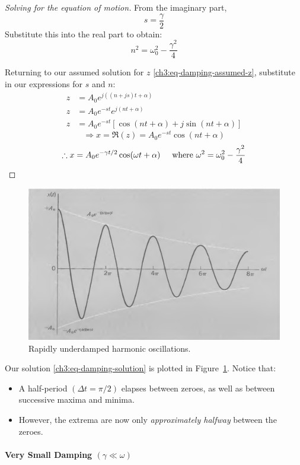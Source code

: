 \begin{proof}[Solving for the equation of motion]
	From the imaginary part,
	\[ s=\frac{\gamma}{2}\]
	Substitute this into the real part to obtain:
	\[ n^2 = \omega_0^2 - \frac{\gamma^2}{4} \]
	
	Returning to our assumed solution for $z$ \eqref{ch3:eq-damping-assumed-z}, substitute in our expressions for $s$ and $n$:
	\begin{align*}
		z&=A_0 e^{j((n+js)t+\alpha)}  \\
		z &= A_0 e^{-st} e^{j(nt+\alpha)} \\
		z &= A_0 e^{-st} [ \cos(nt+\alpha) + j\sin(nt+\alpha)  ]
	\end{align*}
	\[ 	\Longrightarrow x = \Re(z) = A_0 e^{-st}\cos(nt+\alpha) \]
	\[ \therefore 
	x = A_0 e^{-\gamma t/2} \cos(\omega t+\alpha) \hspace{0.5cm}\text{where } \omega^2 = \omega_0^2 - \frac{\gamma^2}{4} \]
\end{proof}


\begin{figure}
	\centering
	\includegraphics[scale=0.55]{phys232/Ch3-underdamping.png} \caption{Rapidly underdamped harmonic oscillations.}\label{ch3:fig-underdamping}
\end{figure}

Our solution \eqref{ch3:eq-damping-solution} is plotted in Figure~\ref{ch3:fig-underdamping}. Notice that:
\begin{itemize}
	\item A half-period $(\Delta t = \pi/2)$ elapses between zeroes, as well as between successive maxima and minima.
	\item However, the extrema are now only \emph{approximately halfway} between the zeroes.
\end{itemize}

\paragraph{Very Small Damping $(\gamma \ll \omega)$}

